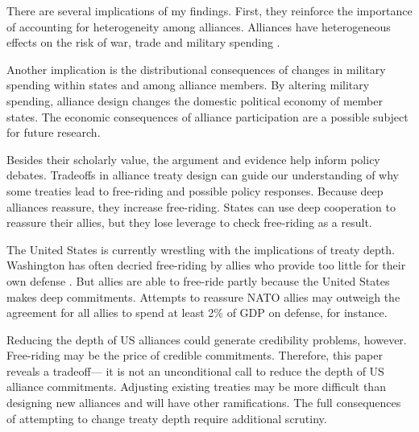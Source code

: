 \documentclass[12pt]{article}
\begin{document}
There are several implications of my findings.  
First, they reinforce the importance of accounting for heterogeneity among alliances.
Alliances have heterogeneous effects on the risk of war, trade and military spending \citep{Leeds2003, LongLeeds2006, Benson2012, DigiuseppePoast2016}. 


Another implication is the distributional consequences of changes in military spending within states and among alliance members.  
By altering military spending, alliance design changes the domestic political economy of member states. 
The economic consequences of alliance participation are a possible subject for future research. 


Besides their scholarly value, the argument and evidence help inform policy debates. 
Tradeoffs in alliance treaty design can guide our understanding of why some treaties lead to free-riding and possible policy responses. 
Because deep alliances reassure, they increase free-riding. 
States can use deep cooperation to reassure their allies, but they lose leverage to check free-riding as a result. 


The United States is currently wrestling with the implications of treaty depth. 
Washington has often decried free-riding by allies who provide too little for their own defense \citep{Lanoszka2015}. 
But allies are able to free-ride partly because the United States makes deep commitments. 
Attempts to reassure NATO allies may outweigh the agreement for all allies to spend at least 2\% of GDP on defense, for instance.


Reducing the depth of US alliances could generate credibility problems, however. 
Free-riding may be the price of credible commitments.  
Therefore, this paper reveals a tradeoff--- it is not an unconditional call to reduce the depth of US alliance commitments. 
Adjusting existing treaties may be more difficult than designing new alliances and will have other ramifications. 
The full consequences of attempting to change treaty depth require additional scrutiny. 

 



\singlespace
 
 
\end{document}
